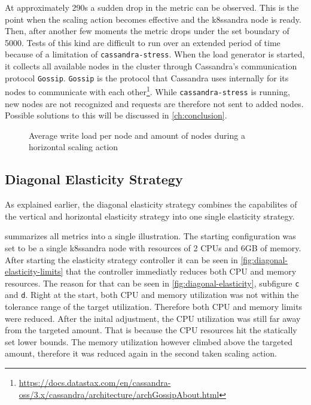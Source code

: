 At approximately 290s a sudden drop in the metric can be observed. This is the point when the scaling action becomes effective and the k8ssandra node is ready. Then, after another few moments the metric drops under the set boundary of 5000. Tests of this kind are difficult to run over an extended period of time because of a limitation of \texttt{cassandra-stress}. When the load generator is started, it collects all available nodes in the cluster through Cassandra's communication protocol \texttt{Gossip}. \texttt{Gossip} is the protocol that Cassandra uses internally for its nodes to communicate with each other\footnote{\raggedright\url{https://docs.datastax.com/en/cassandra-oss/3.x/cassandra/architecture/archGossipAbout.html}}. While \texttt{cassandra-stress} is running, new nodes are not recognized and requests are therefore not sent to added nodes. Possible solutions to this will be discussed in \cref{ch:conclusion}.

\begin{figure}
    \centering
    
    \caption{Average write load per node and amount of nodes during a horizontal scaling action}
    \label{fig:horizontal-elasticity}
\end{figure}

\subsection{Diagonal Elasticity Strategy}

As explained earlier, the diagonal elasticity strategy combines the capabilites of the vertical and horizontal elasticity strategy into one single elasticity strategy.

 summarizes all metrics into a single illustration. The starting configuration was set to be a single k8ssandra node with resources of 2 CPUs and 6GB of memory. After starting the elasticity strategy controller it can be seen in \cref{fig:diagonal-elasticity-limits} that the controller immediatly reduces both CPU and memory resources. The reason for that can be seen in \cref{fig:diagonal-elasticity}, subfigure \texttt{c} and \texttt{d}. Right at the start, both CPU and memory utilization was not within the tolerance range of the target utilization. Therefore both CPU and memory limits were reduced. After the inital adjustment, the CPU utilization was still far away from the targeted amount. That is because the CPU resources hit the statically set lower bounds. The memory utilization however climbed above the targeted amount, therefore it was reduced again in the second taken scaling action.

